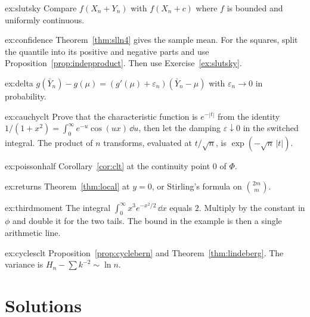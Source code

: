 \begin{hint}{ex:slutsky}
Compare $f(X_n+Y_n)$ with $f(X_n+c)$ where $f$ is bounded and uniformly continuous.
\end{hint}
\begin{hint}{ex:confidence}
Theorem~\ref{thm:slln4} gives the sample mean. For the squares, split the quantile into its positive and negative parts and use Proposition~\ref{prop:indepproduct}. Then use Exercise~\ref{ex:slutsky}.
\end{hint}
\begin{hint}{ex:delta}
$g(\bar Y_n)-g(\mu)=(g'(\mu)+\varepsilon_n)(\bar Y_n-\mu)$ with $\varepsilon_n\to0$ in probability.
\end{hint}
\begin{hint}{ex:cauchyclt}
Prove that the characteristic function is $e^{-|t|}$ from the identity $1/(1+x^2)=\int_0^\infty e^{-u}\cos(ux)\,\dd u$, then let the damping $\varepsilon\downarrow0$ in the switched integral. The product of $n$ transforms, evaluated at $t/\sqrt n$, is $\exp(-\sqrt n\,|t|)$.
\end{hint}
\begin{hint}{ex:poissonhalf}
Corollary~\ref{cor:clt} at the continuity point $0$ of $\Phi$.
\end{hint}
\begin{hint}{ex:returns}
Theorem~\ref{thm:local} at $y=0$, or Stirling's formula on $\binom{2m}{m}$.
\end{hint}
\begin{hint}{ex:thirdmoment}
The integral $\int_0^\infty x^3 e^{-x^2/2}\,\dd x$ equals $2$. Multiply by the constant in $\phi$ and double it for the two tails. The bound in the example is then a single arithmetic line.
\end{hint}
\begin{hint}{ex:cyclesclt}
Proposition~\ref{prop:cyclebern} and Theorem~\ref{thm:lindeberg}. The variance is $H_n-\sum k^{-2}\sim\ln n$.
\end{hint}

\section{Solutions}

